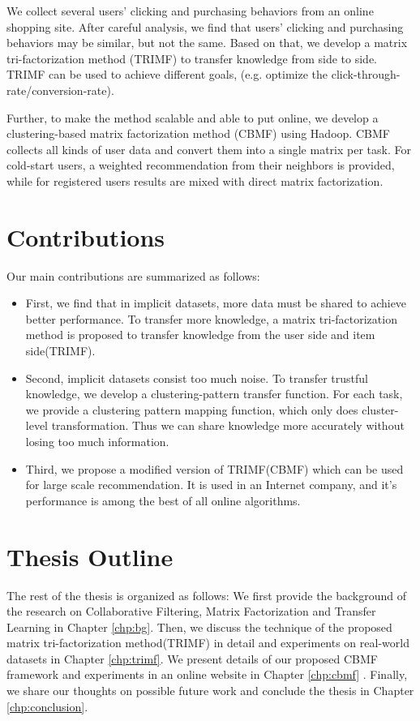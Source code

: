 We collect several users’ clicking and purchasing behaviors from an online shopping site. After careful analysis, we find that users’ clicking and purchasing behaviors may be similar, but not the same. Based on that, we develop a matrix tri-factorization method (TRIMF) to transfer knowledge from side to side. TRIMF can be used to achieve different goals, (e.g. optimize the click-through-rate/conversion-rate).

Further, to make the method scalable and able to put online, we develop a clustering-based matrix factorization method (CBMF) using Hadoop. CBMF collects all kinds of user data and convert them into a single matrix per task. For cold-start users, a weighted recommendation from their neighbors is provided, while for registered users results are mixed with direct matrix factorization.

\hspace{0.1in}
\section{Contributions}

Our main contributions are summarized as follows:

\begin{itemize}[noitemsep,topsep=0pt,parsep=0pt,partopsep=0pt]
\item First, we find that in implicit datasets, more data must be shared to achieve better performance. To transfer more knowledge, a matrix tri-factorization method is proposed to transfer knowledge from the user side and item side(TRIMF).
\item Second, implicit datasets consist too much noise. To transfer trustful knowledge, we develop a clustering-pattern transfer function. For each task, we provide a clustering pattern mapping function, which only does cluster-level transformation. Thus we can share knowledge more accurately without losing too much information.
\item Third, we propose a modified version of TRIMF(CBMF) which can be used for large scale recommendation. It is used in an Internet company, and it's performance is among the best of all online algorithms.
\end{itemize}

\hspace{0.1in}
\section{Thesis Outline}

The rest of the thesis is organized as follows: We first provide the background of the research on Collaborative Filtering, Matrix Factorization and Transfer Learning in Chapter \ref{chp:bg}. Then, we discuss the technique of the proposed matrix tri-factorization method(TRIMF) in detail and experiments on real-world datasets in Chapter \ref{chp:trimf}. We present details of our proposed CBMF framework and experiments in an online website in Chapter \ref{chp:cbmf} . Finally, we share our thoughts on possible future work and conclude the thesis in Chapter \ref{chp:conclusion}.



